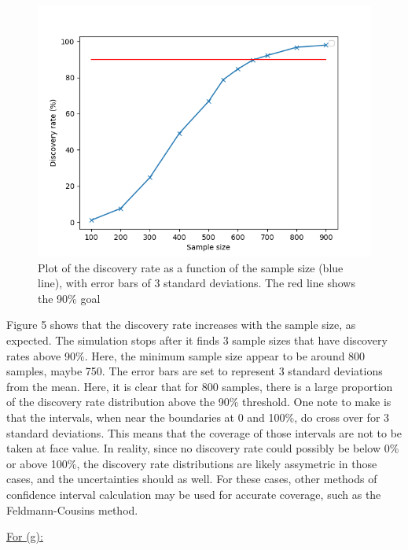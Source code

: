 \documentclass[12pt]{report} %
\begin{document}
\begin{figure}[htb]
    \centering
    \includegraphics[width=\textwidth]{../plots/plot_f.png}
    \captionsetup{margin=1.3cm}
    \caption[width=0.2\pdfpagewidth]{Plot of the discovery rate as a function of the sample size (blue line), with error bars of 3 standard deviations. The red line shows the 90\% goal}
\end{figure}
\vspace{1\baselineskip}
Figure 5 shows that the discovery rate increases with the sample size, as expected. The simulation stops after it finds 3 sample sizes that have discovery rates above 90\%. Here, the minimum sample size appear to be around 800 samples, maybe 750. The error bars are set to represent 3 standard deviations from the mean. Here, it is clear that for 800 samples, there is a large proportion of the discovery rate distribution above the 90\% threshold. One note to make is that the intervals, when near the boundaries at 0 and 100\%, do cross over for 3 standard deviations. This means that the coverage of those intervals are not to be taken at face value. In reality, since no discovery rate could possibly be below 0\% or above 100\%, the discovery rate distributions are likely assymetric in those cases, and the uncertainties should as well. For these cases, other methods of confidence interval calculation may be used for accurate coverage, such as the Feldmann-Cousins method\cite{PhysRevD.57.3873}. 

\vspace*{1\baselineskip}

\underline{For (g):}
\end{document}
